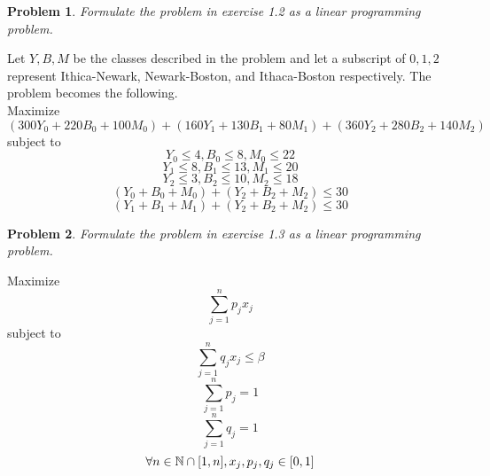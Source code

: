 \documentclass[12pt,oneside]{amsart}
\numberwithin{equation}{section}
\numberwithin{figure}{section}
\theoremstyle{plain}
\newtheorem{prob}{Problem}
\theoremstyle{definition}
\newcommand{\N}{\ensuremath \mathbb{N}}
\begin{document}
\begin{prob}
Formulate the problem in exercise 1.2 as a linear programming problem.
\end{prob}
Let $Y,B,M$ be the classes described in the problem and let a subscript of 
$0,1,2$ represent Ithica-Newark, Newark-Boston, and Ithaca-Boston respectively. 
The problem becomes the following. \\
Maximize
\[(300Y_0 + 220B_0 + 100M_0) + (160Y_1 + 130B_1 + 80M_1) + (360Y_2 + 280B_2 + 140M_2)\]
subject to
\[Y_0 \leq 4, B_0 \leq 8, M_0 \leq 22\]
\[Y_1 \leq 8, B_1 \leq 13, M_1 \leq 20\]
\[Y_2 \leq 3, B_2 \leq 10, M_2 \leq 18\]
\[(Y_0 + B_0 + M_0) + (Y_2 + B_2 + M_2) \leq 30\]
\[(Y_1 + B_1 + M_1) + (Y_2 + B_2 + M_2) \leq 30\]

\begin{prob}
Formulate the problem in exercise 1.3 as a linear programming problem.
\end{prob}

Maximize
\[\sum_{j=1}^{n}p_jx_j\]
subject to
\[\sum_{j=1}^{n}q_jx_j \leq \beta\]
\[\sum_{j=1}^{n}p_j = 1\]
\[\sum_{j=1}^{n}q_j = 1\]
\[\forall n \in \N \cap [1,n], x_j,p_j,q_j \in [0,1]\]
\end{document}
